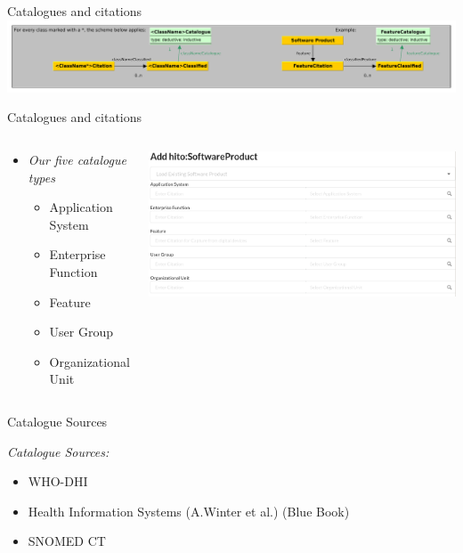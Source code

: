 \documentclass[aspectratio=1610,12pt]{beamer}
\newcommand{\enquote}[1]{{\glqq#1\grqq{}}}
\begin{document}
\begin{frame}{Catalogues and citations}
\centering
\includegraphics[width=\textwidth]{img/excerpt1.pdf}
\end{frame}

\begin{frame}{Catalogues and citations}
\begin{columns}
  \vspace{-1cm}
  \begin{spacing}{1.25}
    \begin{itemize}
      \item \emph{Our five catalogue types}
      \begin{itemize}
        \item Application System
        \item Enterprise Function
        \item Feature
        \item User Group
        \item Organizational Unit
      \end{itemize}
    \end{itemize}
  \end{spacing}
  \centering
  \includegraphics[width=\textwidth]{img/iglook.png}
\end{columns}
\end{frame}

\begin{frame}{Catalogue Sources}
  \begin{spacing}{1.25}
  \emph{Catalogue Sources:}
  \begin{itemize}
    \item WHO-DHI
    \item Health Information Systems (A.Winter et al.) (\enquote{Blue Book})
    \item SNOMED CT
  \end{itemize}
\end{spacing}
\end{frame}
\end{document}
